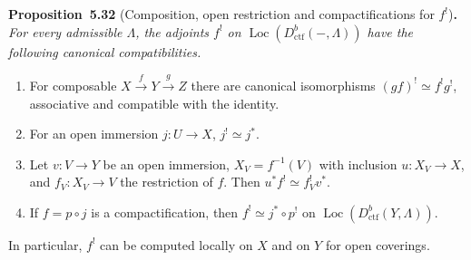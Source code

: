 \documentclass[11pt]{article}
\newenvironment{bpstatement}[2]{\par\addvspace{0.6\baselineskip}\noindent\textbf{#1}#2\textbf{.}\enspace\ignorespaces}
  {\par\addvspace{0.4\baselineskip}}
\newenvironment{bpstatementit}[2]{\begin{bpstatement}{#1}{#2}\itshape\ignorespaces}{\end{bpstatement}}
\providecommand{\Loc}{}\renewcommand{\Loc}{\operatorname{Loc}}
\begin{document}
\label{bp104}%
\begin{bpstatementit}{Proposition~5.32}{ (Composition, open restriction and compactifications for $f^!$)}
For every admissible \(\Lambda\), the adjoints \(f^!\) on \(\Loc(D^b_{\mathrm{ctf}}(-,\Lambda))\) have the following canonical compatibilities.

\begin{enumerate}
\item For composable \(X\xrightarrow fY\xrightarrow gZ\) there are canonical isomorphisms \((gf)^!\simeq f^!g^!\), associative and compatible with the identity.
\item For an open immersion \(j:U\to X\), \(j^!\simeq j^*\).
\item Let \(v:V\to Y\) be an open immersion, \(X_V=f^{-1}(V)\) with inclusion \(u:X_V\to X\), and \(f_V:X_V\to V\) the restriction of \(f\). Then \(u^*f^!\simeq f_V^!v^*\).
\item If \(f=p\circ j\) is a compactification, then \(f^!\simeq j^*\circ p^!\) on \(\Loc(D^b_{\mathrm{ctf}}(Y,\Lambda))\).
\end{enumerate}

In particular, \(f^!\) can be computed locally on \(X\) and on \(Y\) for open coverings.
\end{bpstatementit}
\end{document}
